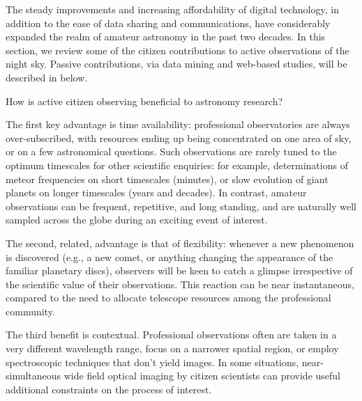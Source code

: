\documentclass{ar2e}
\begin{document}
The steady improvements and increasing affordability of digital technology, in
addition to the ease of data sharing and communications, have considerably
expanded the realm of amateur astronomy in the past two decades.  
In this section, we review some of the citizen contributions to active
observations of the night sky.  Passive contributions, via data mining and
web-based studies, will be described in  below.

How is active citizen observing beneficial to astronomy research? 

The first key advantage is time availability: professional observatories are
always over-subscribed, with resources ending up being concentrated on one area
of sky, or on a few astronomical questions.  Such observations are rarely tuned
to the optimum timescales for other scientific enquiries: for example,
determinations of meteor frequencies on short timescales (minutes), or slow
evolution of giant planets on longer timescales (years and decades).  In
contrast, amateur observations can be frequent, repetitive, and long standing,
and are naturally well sampled across the globe during an exciting event of
interest. 

The second, related, advantage is that of flexibility: whenever a new phenomenon
is discovered (e.g., a new comet, or anything changing the appearance of the
familiar planetary discs), observers will be keen to catch a glimpse
irrespective of the scientific value of their observations.  This reaction can
be near instantaneous, compared to the need to allocate telescope resources
among the professional community.  

The third benefit is contextual.  Professional observations often are taken in a
very different wavelength range, focus on a narrower spatial region, or employ
spectroscopic techniques that don't yield images. In some situations,
near-simultaneous wide field optical imaging by citizen scientists can provide
useful additional constraints on the process of interest.
\end{document}
